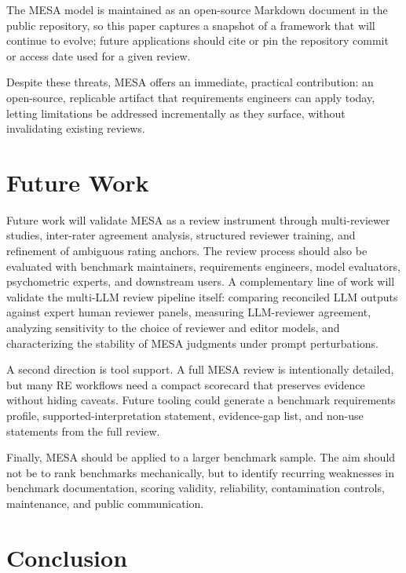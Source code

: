 \documentclass[conference]{IEEEtran}
\begin{document}
        The MESA model is maintained as an open-source Markdown document in the public repository, so this paper captures a snapshot of a framework that will continue to evolve; future applications should cite or pin the repository commit or access date used for a given review.
        
        Despite these threats, MESA offers an immediate, practical contribution: an open-source, replicable artifact that requirements engineers can apply today, letting limitations be addressed incrementally as they surface, without invalidating existing reviews.

\section{Future Work}
\label{sec:future}

    Future work will validate MESA as a review instrument through multi-reviewer studies, inter-rater agreement analysis, structured reviewer training, and refinement of ambiguous rating anchors. The review process should also be evaluated with benchmark maintainers, requirements engineers, model evaluators, psychometric experts, and downstream users. A complementary line of work will validate the multi-LLM review pipeline itself: comparing reconciled LLM outputs against expert human reviewer panels, measuring LLM-reviewer agreement, analyzing sensitivity to the choice of reviewer and editor models, and characterizing the stability of MESA judgments under prompt perturbations.
    
    A second direction is tool support. A full MESA review is intentionally detailed, but many RE workflows need a compact scorecard that preserves evidence without hiding caveats. Future tooling could generate a benchmark requirements profile, supported-interpretation statement, evidence-gap list, and non-use statements from the full review.
    
    Finally, MESA should be applied to a larger benchmark sample. The aim should not be to rank benchmarks mechanically, but to identify recurring weaknesses in benchmark documentation, scoring validity, reliability, contamination controls, maintenance, and public communication.

\section{Conclusion}
\end{document}
